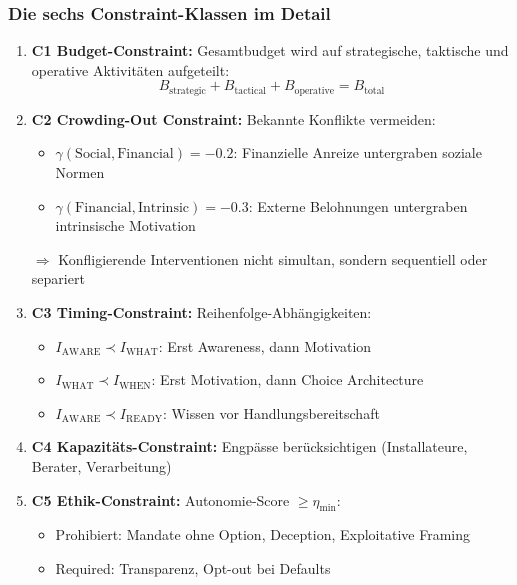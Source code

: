 \subsubsection{Die sechs Constraint-Klassen im Detail}

\begin{enumerate}
\item \textbf{C1 Budget-Constraint:} Gesamtbudget wird auf strategische, taktische und operative Aktivitäten aufgeteilt:
\begin{equation}
B_{\text{strategic}} + B_{\text{tactical}} + B_{\text{operative}} = B_{\text{total}}
\end{equation}

\item \textbf{C2 Crowding-Out Constraint:} Bekannte Konflikte vermeiden:
\begin{itemize}[nosep]
\item $\gamma(\text{Social}, \text{Financial}) = -0.2$: Finanzielle Anreize untergraben soziale Normen
\item $\gamma(\text{Financial}, \text{Intrinsic}) = -0.3$: Externe Belohnungen untergraben intrinsische Motivation
\end{itemize}
$\Rightarrow$ Konfligierende Interventionen nicht simultan, sondern sequentiell oder separiert

\item \textbf{C3 Timing-Constraint:} Reihenfolge-Abhängigkeiten:
\begin{itemize}[nosep]
\item $I_{\text{AWARE}} \prec I_{\text{WHAT}}$: Erst Awareness, dann Motivation
\item $I_{\text{WHAT}} \prec I_{\text{WHEN}}$: Erst Motivation, dann Choice Architecture
\item $I_{\text{AWARE}} \prec I_{\text{READY}}$: Wissen vor Handlungsbereitschaft
\end{itemize}

\item \textbf{C4 Kapazitäts-Constraint:} Engpässe berücksichtigen (Installateure, Berater, Verarbeitung)

\item \textbf{C5 Ethik-Constraint:} Autonomie-Score $\geq \eta_{\min}$:
\begin{itemize}[nosep]
\item Prohibiert: Mandate ohne Option, Deception, Exploitative Framing
\item Required: Transparenz, Opt-out bei Defaults
\end{itemize}


\end{enumerate}
